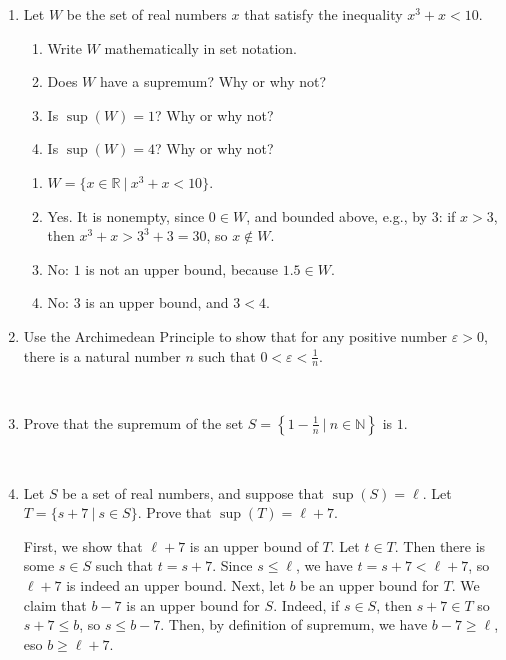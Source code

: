 \documentclass[12pt]{amsart}
\def\e{\varepsilon}
\newcommand{\R}{{\mathbb{R}}}
\newcommand{\N}{\mathbb{N}}
\numberwithin{equation}{section}
\theoremstyle{plain} %
\theoremstyle{definition}
\theoremstyle{remark}
\begin{document}
\begin{enumerate}
\item Let $W$ be the set of real numbers $x$ that satisfy the inequality $x^3+x<10$.
\begin{enumerate}
\item Write $W$ mathematically in set notation.
\item Does $W$ have a supremum? Why or why not?
\item Is $\sup(W)=1$?  Why or why not?
\item Is $\sup(W)=4$?  Why or why not?
\end{enumerate}

\begin{framed}
\begin{enumerate}
\item $W=\{ x\in \R \ | \ x^3 + x < 10\}$.
\item Yes. It is nonempty, since $0\in W$, and bounded above, e.g., by $3$: if $x> 3$, then $x^3+ x > 3^3+3 = 30$, so $x\notin W$.
\item No: $1$ is not an upper bound, because $1.5\in W$.
\item No: $3$ is an upper bound, and $3<4$.
\end{enumerate}
\end{framed}

\item Use the Archimedean Principle to show that for any positive number $\e>0$, there is a natural number $n$ such that $ 0 < \e < \frac{1}{n}$.

\

\item Prove that the supremum of the set $S= \left\{ 1 - \frac1n \ | \ n\in \N\right\}$ is $1$.

\

\item Let $S$ be a set of real numbers, and suppose that $\sup(S)=\ell$. Let $T=\{s+7 \ | \ s\in S\}$. Prove that $\sup(T) = \ell + 7$.

\begin{framed}
First, we show that $\ell+7$ is an upper bound of $T$. Let $t\in T$. Then there is some $s\in S$ such that $t=s+7$. Since $s\leq \ell$, we have $t=s+7 < \ell+7$, so $\ell+7$ is indeed an upper bound. Next, let $b$ be an upper bound for $T$. We claim that $b-7$ is an upper bound for $S$. Indeed, if $s\in S$, then $s+7\in T$ so $s+7 \leq b$, so $s\leq b-7$. Then, by definition of supremum, we have $b-7\geq \ell$, eso $b\geq \ell+7$.
\end{framed}


\end{enumerate}
\end{document}

